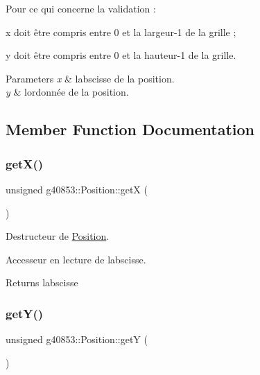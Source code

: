 Pour ce qui concerne la validation \+:
\begin{DoxyItemize}
\item x doit être compris entre 0 et la largeur-\/1 de la grille ;
\item y doit être compris entre 0 et la hauteur-\/1 de la grille.
\end{DoxyItemize}


\begin{DoxyParams}{Parameters}
{\em x} & l\textquotesingle{}abscisse de la position. \\
\hline
{\em y} & l\textquotesingle{}ordonnée de la position. \\
\hline
\end{DoxyParams}


\subsection{Member Function Documentation}
\hypertarget{classg40853_1_1_position_a1e7bd91fa0db9bee5674d454cd6a6b69}{}\label{classg40853_1_1_position_a1e7bd91fa0db9bee5674d454cd6a6b69} 
\subsubsection{\texorpdfstring{get\+X()}{getX()}}
{\footnotesize\ttfamily unsigned g40853\+::\+Position\+::getX (\begin{DoxyParamCaption}{ }\end{DoxyParamCaption})\hspace{0.3cm}{\ttfamily [inline]}}



Destructeur de \hyperlink{classg40853_1_1_position}{Position}. 

Accesseur en lecture de l\textquotesingle{}abscisse.

\begin{DoxyReturn}{Returns}
l\textquotesingle{}abscisse 
\end{DoxyReturn}
\hypertarget{classg40853_1_1_position_a7bba87fac1407b339f6d9a917f8b19ab}{}\label{classg40853_1_1_position_a7bba87fac1407b339f6d9a917f8b19ab} 
\subsubsection{\texorpdfstring{get\+Y()}{getY()}}
{\footnotesize\ttfamily unsigned g40853\+::\+Position\+::getY (\begin{DoxyParamCaption}{ }\end{DoxyParamCaption})\hspace{0.3cm}{\ttfamily [inline]}}



